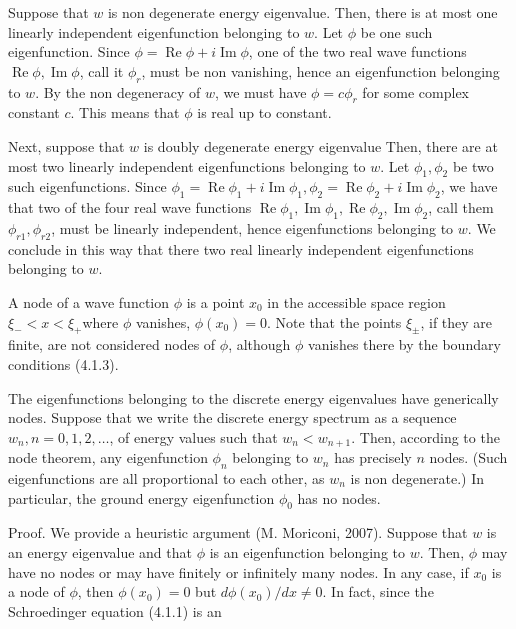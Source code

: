 \documentclass{article}
\begin{document}
Suppose that $w$ is non degenerate energy eigenvalue. Then, there is at most one linearly independent eigenfunction belonging to $w$. Let $\phi$ be one such eigenfunction. Since $\phi=\operatorname{Re} \phi+i \operatorname{Im} \phi$, one of the two real wave functions $\operatorname{Re} \phi, \operatorname{Im} \phi$, call it $\phi_{r}$, must be non vanishing, hence an eigenfunction belonging to $w$. By the non degeneracy of $w$, we must have $\phi=c \phi_{r}$ for some complex constant $c$. This means that $\phi$ is real up to constant.

Next, suppose that $w$ is doubly degenerate energy eigenvalue Then, there are at most two linearly independent eigenfunctions belonging to $w$. Let $\phi_{1}, \phi_{2}$ be two such eigenfunctions. Since $\phi_{1}=\operatorname{Re} \phi_{1}+i \operatorname{Im} \phi_{1}, \phi_{2}=\operatorname{Re} \phi_{2}+i \operatorname{Im} \phi_{2}$, we have that two of the four real wave functions $\operatorname{Re} \phi_{1}, \operatorname{Im} \phi_{1}, \operatorname{Re} \phi_{2}, \operatorname{Im} \phi_{2}$, call them $\phi_{r 1}, \phi_{r 2}$, must be linearly independent, hence eigenfunctions belonging to $w$. We conclude in this way that there two real linearly independent eigenfunctions belonging to $w$.

A node of a wave function $\phi$ is a point $x_{0}$ in the accessible space region $\xi_{-}<x<\xi_{+}$where $\phi$ vanishes, $\phi\left(x_{0}\right)=0$. Note that the points $\xi_{ \pm}$, if they are finite, are not considered nodes of $\phi$, although $\phi$ vanishes there by the boundary conditions (4.1.3).

The eigenfunctions belonging to the discrete energy eigenvalues have generically nodes. Suppose that we write the discrete energy spectrum as a sequence $w_{n}, n=0,1,2, \ldots$, of energy values such that $w_{n}<w_{n+1}$. Then, according to the node theorem,
any eigenfunction $\phi_{n}$ belonging to $w_{n}$ has precisely $n$ nodes.
(Such eigenfunctions are all proportional to each other, as $w_{n}$ is non degenerate.) In particular, the ground energy eigenfunction $\phi_{0}$ has no nodes.

Proof. We provide a heuristic argument (M. Moriconi, 2007). Suppose that $w$ is an energy eigenvalue and that $\phi$ is an eigenfunction belonging to $w$. Then, $\phi$ may have no nodes or may have finitely or infinitely many nodes. In any case, if $x_{0}$ is a node of $\phi$, then $\phi\left(x_{0}\right)=0$ but $d \phi\left(x_{0}\right) / d x \neq 0$. In fact, since the Schroedinger equation (4.1.1) is an
\end{document}
